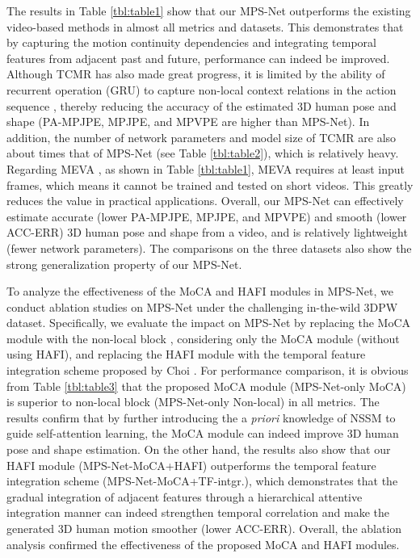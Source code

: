 \documentclass[10pt,twocolumn,letterpaper]{article}
\begin{document}
The results in Table \ref{tbl:table1} show that our MPS-Net outperforms the existing video-based methods in almost all metrics and datasets. This demonstrates that by capturing the motion continuity dependencies and integrating temporal features from adjacent past and future, performance can indeed be improved. Although TCMR \cite{choi2020beyond} has also made great progress, it is limited by the ability of recurrent operation (\ie GRU) to capture non-local context relations in the action sequence \cite{Vaswani2017AttentionIA,Wang2018NonlocalNN}, thereby reducing the accuracy of the estimated 3D human pose and shape (\ie PA-MPJPE, MPJPE, and MPVPE are higher than MPS-Net). In addition, the number of network parameters and model size of TCMR are also about  times that of MPS-Net (see Table \ref{tbl:table2}), which is relatively heavy. Regarding MEVA \cite{Luo_2020_ACCV}, as shown in Table \ref{tbl:table1}, MEVA requires at least  input frames, which means it cannot be trained and tested on short videos. This greatly reduces the value in practical applications. Overall, our MPS-Net can effectively estimate accurate (lower PA-MPJPE, MPJPE, and MPVPE) and smooth (lower ACC-ERR) 3D human pose and shape from a video, and is relatively lightweight (fewer network parameters). The comparisons on the three datasets also show the strong generalization property of our MPS-Net.

\vspace{1pt}
 To analyze the effectiveness of the MoCA and HAFI modules in MPS-Net, we conduct ablation studies on MPS-Net under the challenging in-the-wild 3DPW dataset. Specifically, we evaluate the impact on MPS-Net by replacing the MoCA module with the non-local block \cite{Wang2018NonlocalNN}, considering only the MoCA module (without using HAFI), and replacing the HAFI module with the temporal feature integration scheme proposed by Choi \etal \cite{choi2020beyond}. For performance comparison, it is obvious from Table \ref{tbl:table3} that the proposed MoCA module (\ie MPS-Net-only MoCA) is superior to non-local block (\ie MPS-Net-only Non-local) in all metrics. The results confirm that by further introducing the a \emph{priori} knowledge of NSSM to guide self-attention learning, the MoCA module can indeed improve 3D human pose and shape estimation. On the other hand, the results also show that our HAFI module (\ie MPS-Net-MoCA+HAFI) outperforms the temporal feature integration scheme (\ie MPS-Net-MoCA+TF-intgr.), which demonstrates that the gradual integration of adjacent features through a hierarchical attentive integration manner can indeed strengthen temporal correlation and make the generated 3D human motion smoother (\ie lower ACC-ERR). Overall, the ablation analysis confirmed the effectiveness of the proposed MoCA and HAFI modules.\vspace{1pt}
\end{document}
